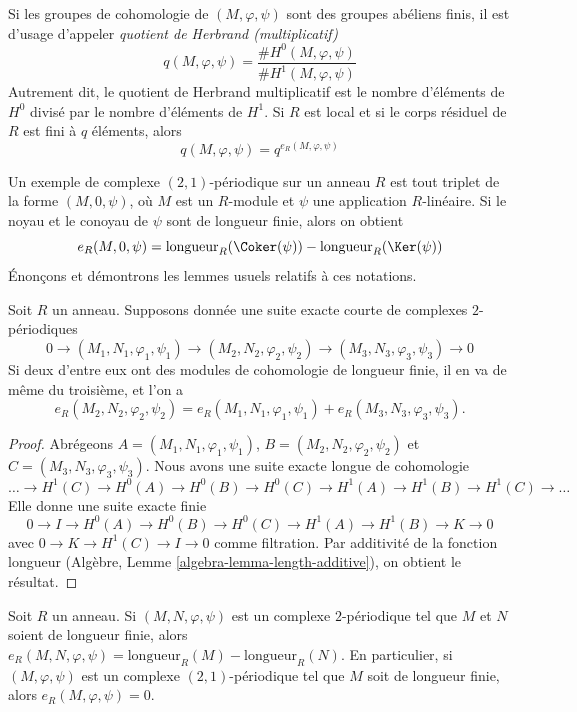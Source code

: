 \noindent
Si les groupes de cohomologie de $(M, \varphi, \psi)$
sont des groupes abéliens finis, il est d'usage d'appeler
{\it quotient de Herbrand (multiplicatif)}
$$
q(M, \varphi, \psi) =
\frac{\# H^0(M, \varphi, \psi)}{\# H^1(M, \varphi, \psi)}
$$
Autrement dit, le quotient de Herbrand multiplicatif est le nombre d'éléments de
$H^0$ divisé par le nombre d'éléments de $H^1$. Si $R$ est local et si
le corps résiduel de $R$ est fini à $q$ éléments, alors
$$
q(M, \varphi, \psi) = q^{e_R(M, \varphi, \psi)}
$$

\medskip\noindent
Un exemple de complexe $(2, 1)$-périodique sur un anneau $R$ est tout triplet
de la forme $(M, 0, \psi)$, où $M$ est un $R$-module et $\psi$ une application
$R$-linéaire. Si le noyau et le conoyau de $\psi$ sont de longueur finie,
alors on obtient
\begin{equation}
\label{equation-multiplicity-coker-ker}
e_R(M, 0, \psi) = \text{longueur}_R(\Coker(\psi)) - \text{longueur}_R(\Ker(\psi))
\end{equation}
Énonçons et démontrons les lemmes usuels relatifs à ces notations.

\begin{lemma}
\label{lemma-additivity-periodic-length}
Soit $R$ un anneau. Supposons donnée une suite exacte courte de
complexes $2$-périodiques
$$
0 \to (M_1, N_1, \varphi_1, \psi_1)
\to (M_2, N_2, \varphi_2, \psi_2)
\to (M_3, N_3, \varphi_3, \psi_3)
\to 0
$$
Si deux d'entre eux ont des modules de cohomologie de longueur finie, il en va de même
du troisième, et l'on a
$$
e_R(M_2, N_2, \varphi_2, \psi_2) =
e_R(M_1, N_1, \varphi_1, \psi_1) +
e_R(M_3, N_3, \varphi_3, \psi_3).
$$
\end{lemma}

\begin{proof}
Abrégeons $A = (M_1, N_1, \varphi_1, \psi_1)$,
$B = (M_2, N_2, \varphi_2, \psi_2)$ et $C = (M_3, N_3, \varphi_3, \psi_3)$.
Nous avons une suite exacte longue de cohomologie
$$
\ldots
\to H^1(C)
\to H^0(A)
\to H^0(B)
\to H^0(C)
\to H^1(A)
\to H^1(B)
\to H^1(C)
\to \ldots
$$
Elle donne une suite exacte finie
$$
0 \to I
\to H^0(A)
\to H^0(B)
\to H^0(C)
\to H^1(A)
\to H^1(B)
\to K \to 0
$$
avec $0 \to K \to H^1(C) \to I \to 0$ comme filtration. Par additivité de
la fonction longueur (Algèbre, Lemme \ref{algebra-lemma-length-additive}),
on obtient le résultat.
\end{proof}

\begin{lemma}
\label{lemma-finite-periodic-length}
Soit $R$ un anneau. Si $(M, N, \varphi, \psi)$ est un complexe $2$-périodique
tel que $M$ et $N$ soient de longueur finie, alors
$e_R(M, N, \varphi, \psi) = \text{longueur}_R(M) - \text{longueur}_R(N)$.
En particulier, si $(M, \varphi, \psi)$ est un complexe $(2, 1)$-périodique
tel que $M$ soit de longueur finie, alors
$e_R(M, \varphi, \psi) = 0$.
\end{lemma}

